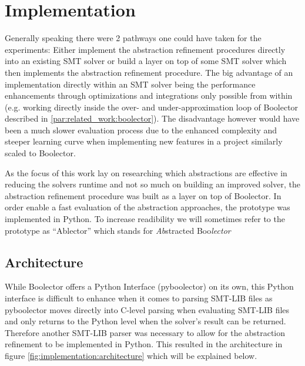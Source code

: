 \chapter{Implementation}
\label{ch:implementation}

Generally speaking there were 2 pathways one could have taken for the experiments:
Either implement the abstraction refinement procedures directly into an existing SMT solver or build a layer on top of some SMT solver which then implements the abstraction refinement procedure.
The big advantage of an implementation directly within an SMT solver being the performance enhancements through optimizations and integrations only possible from within
(e.g. working directly inside the over- and under-approximation loop of Boolector described in \ref{par:related_work:boolector}).
The disadvantage however would have been a much slower evaluation process due to the enhanced complexity and steeper learning curve when implementing new features
in a project similarly scaled to Boolector.
\par
As the focus of this work lay on researching which abstractions are effective in reducing the solvers runtime and not so much on building an improved solver,
the abstraction refinement procedure was built as a layer on top of Boolector.
In order enable a fast evaluation of the abstraction approaches, the prototype was implemented in Python.
To increase readibility we will sometimes refer to the prototype as \enquote{Ablector} which stands for \textit{Ab}stracted Boo\textit{lector}

\section{Architecture}
While Boolector offers a Python Interface (pyboolector) on its own, this Python interface is difficult to enhance when it comes to parsing SMT-LIB files
as pyboolector moves directly into C-level parsing when evaluating SMT-LIB files and only returns to the Python level when the solver's result can be returned.
Therefore another SMT-LIB parser was necessary to allow for the abstraction refinement to be implemented in Python.
This resulted in the architecture in figure \ref{fig:implementation:architecture} which will be explained below.

